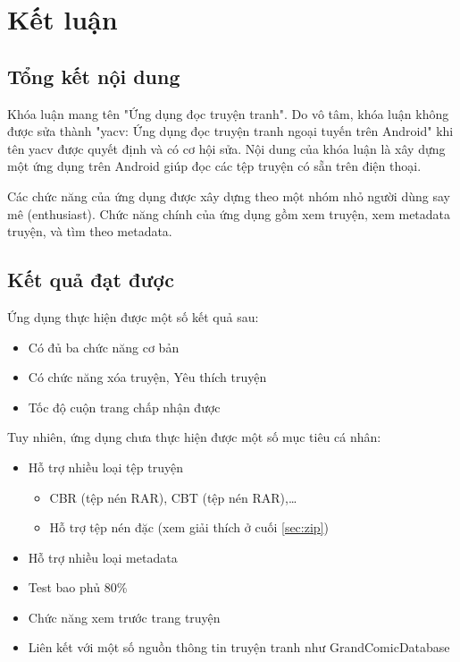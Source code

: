 \documentclass[../../thesis]{subfiles}
\begin{document}
\chapter{Kết luận}\label{chap:conclusion}

\section{Tổng kết nội dung}\label{sec:summary}

Khóa luận mang tên "Ứng dụng đọc truyện tranh". Do vô tâm, khóa luận không được
sửa thành "yacv: Ứng dụng đọc truyện tranh ngoại tuyến trên Android" khi tên
yacv được quyết định và có cơ hội sửa. Nội dung của khóa luận là xây dựng một
ứng dụng trên Android giúp đọc các tệp truyện có sẵn trên điện thoại.

Các chức năng của ứng dụng được xây dựng theo một nhóm nhỏ người dùng say mê
(enthusiast). Chức năng chính của ứng dụng gồm xem truyện, xem metadata truyện,
và tìm theo metadata.

\section{Kết quả đạt được}\label{sec:thesis_result}

Ứng dụng thực hiện được một số kết quả sau:

\begin{itemize}
    \item Có đủ ba chức năng cơ bản
    \item Có chức năng xóa truyện, Yêu thích truyện
    \item Tốc độ cuộn trang chấp nhận được
\end{itemize}

Tuy nhiên, ứng dụng chưa thực hiện được một số mục tiêu cá nhân:

\begin{itemize}
    \item

        Hỗ trợ nhiều loại tệp truyện

        \begin{itemize}
            \item CBR (tệp nén RAR), CBT (tệp nén RAR),\ldots
            \item Hỗ trợ tệp nén đặc (xem giải thích ở cuối \autoref{sec:zip})
        \end{itemize}

    \item Hỗ trợ nhiều loại metadata
    \item Test bao phủ 80\%
    \item Chức năng xem trước trang truyện
    \item Liên kết với một số nguồn thông tin truyện tranh như
        GrandComicDatabase
\end{itemize}
\end{document}
